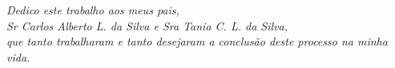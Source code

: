 \begin{dedicatoria}
   \vspace*{\fill}
   \begin{flushright}
   	\textit{Dedico este trabalho aos meus pais, \\ Sr Carlos Alberto L. da Silva e Sra Tania C. L. da Silva, \\ que tanto trabalharam e tanto desejaram a conclusão deste processo na minha vida.}
   	
   \end{flushright}
\end{dedicatoria}
